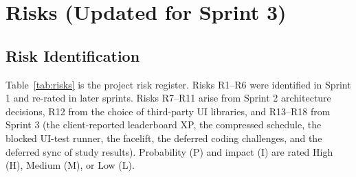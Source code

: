 \documentclass[12pt,letterpaper]{article}
\begin{document}
\section{Risks (Updated for Sprint 3)}\label{sec:risks}

\subsection{Risk Identification}
Table~\ref{tab:risks} is the project risk register. Risks R1--R6 were identified in
Sprint 1 and re-rated in later sprints. Risks R7--R11 arise from Sprint 2 architecture
decisions, R12 from the choice of third-party UI libraries, and R13--R18 from Sprint 3
(the client-reported leaderboard XP, the compressed schedule, the blocked UI-test
runner, the facelift, the deferred coding challenges, and the deferred sync of study
results). Probability (P) and impact (I) are rated High (H), Medium (M), or Low (L).
\end{document}

